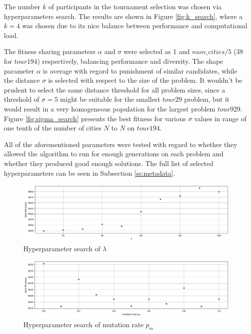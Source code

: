 \documentclass[a4paper,10pt]{article}
\begin{document}
The number $k$ of participants in the tournament selection was chosen via hyperparameters search. The results are shown in Figure \ref{fig:k_search}, where a $k=4$ was chosen due to its nice balance between performance and computational load.

The fitness sharing parameters $\alpha$ and $\sigma$ were selected as 1 and $num\_cities / 5$ ($38$ for $tour194$) respectively, balancing performance and diversity. The shape parameter $\alpha$ is average with regard to punishment of similar candidates, while the distance $\sigma$ is selected with respect to the size of the problem. It wouldn't be prudent to select the same distance threshold for all problem sizes, since a threshold of $\sigma=5$ might be suitable for the smallest $tour29$ problem, but it would result in a very homogeneous population for the largest problem $tour929$. Figure \ref{fig:sigma_search} presents the best fitness for various $\sigma$ values in range of one tenth of the number of cities $N$ to $N$ on $tour194$.

All of the aforementioned parameters were tested with regard to whether they allowed the algorithm to run for enough generations on each problem and whether they produced good enough solutions. The full list of selected hyperparameters can be seen in Subsection \ref{ss:metadata}.

\begin{figure}[H]
\centering
\includegraphics[width=\textwidth]{results/tuning/lambda_hyperparameter_search.png}
\caption{Hyperparameter search of $\lambda$}\label{fig:lambda_search}
\end{figure}%

\begin{figure}[H]
\includegraphics[width=\textwidth]{results/tuning/mutation_rate_hyperparameter_search.png}
\caption{Hyperparameter search of mutation rate $p_m$}
\label{fig:pm_search}
\end{figure}%
\end{document}
